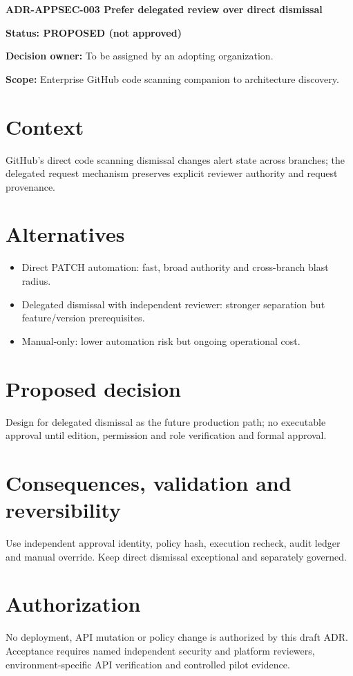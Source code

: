 \documentclass[11pt,letterpaper]{article}
\begin{document}
{\LARGE\bfseries ADR-APPSEC-003 Prefer delegated review over direct dismissal}\par
\textbf{Status: PROPOSED (not approved)}\par
\textbf{Decision owner:} To be assigned by an adopting organization.\par
\textbf{Scope:} Enterprise GitHub code scanning companion to architecture discovery.
\section{Context}
GitHub's direct code scanning dismissal changes alert state across branches; the delegated request mechanism preserves explicit reviewer authority and request provenance.
\section{Alternatives}
\begin{itemize}
\item Direct PATCH automation: fast, broad authority and cross-branch blast radius.
\item Delegated dismissal with independent reviewer: stronger separation but feature/version prerequisites.
\item Manual-only: lower automation risk but ongoing operational cost.
\end{itemize}
\section{Proposed decision}
Design for delegated dismissal as the future production path; no executable approval until edition, permission and role verification and formal approval.
\section{Consequences, validation and reversibility}
Use independent approval identity, policy hash, execution recheck, audit ledger and manual override. Keep direct dismissal exceptional and separately governed.
\section{Authorization}
No deployment, API mutation or policy change is authorized by this draft ADR. Acceptance requires named independent security and platform reviewers, environment-specific API verification and controlled pilot evidence.
\end{document}
